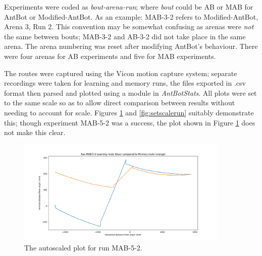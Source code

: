 \documentclass[a4paper,11pt,twoside,openright]{article}
\begin{document}
Experiments were coded as \textit{bout-arena-run}; where \textit{bout} could be
AB or MAB for AntBot or Modified-AntBot. As an example: MAB-3-2 refers to Modified-AntBot, Arena 3, Run 2. This convention may
be somewhat confusing as arenas were \textit{not} the same between bouts; MAB-3-2 and AB-3-2 did not take place in the same arena. The
arena numbering was reset after modifying AntBot's behaviour. There were four arenas for AB experiments and five for MAB experiments.
\newline


The routes were captured using the Vicon motion capture system; separate recordings were taken for learning and memory runs, the
files exported in .csv format then parsed and plotted using a module in \textit{AntBotStats}. All plots were set to the same scale
so as to allow direct comparison between results without needing to account for scale. Figures \ref{fig:autoscalerun} and \ref{fig:setscalerun}
suitably demonstrate this; though experiment MAB-5-2 was a success, the plot shown in Figure \ref{fig:autoscalerun} does not make this clear.

\begin{figure}
  \centering
  \includegraphics[width=0.9\textwidth]{MAB-5-2-notscaled}
  \caption{
   \label{fig:autoscalerun}The autoscaled plot for run MAB-5-2.
  }
\end{figure}
\end{document}
